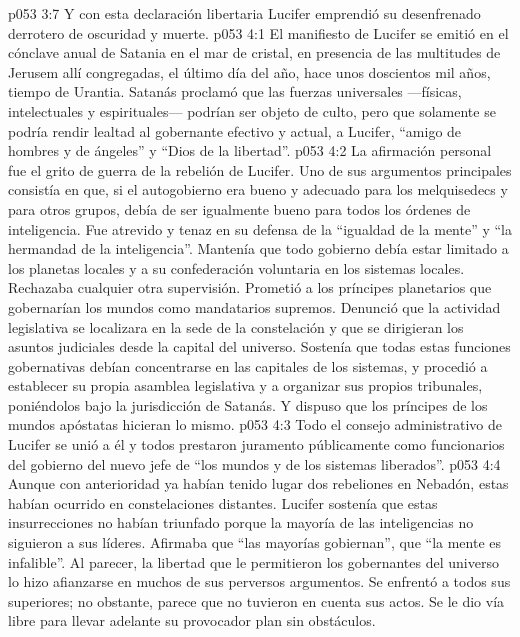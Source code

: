 \vs p053 3:7 \pc Y con esta declaración libertaria Lucifer emprendió su desenfrenado derrotero de oscuridad y muerte.
\vs p053 4:1 El manifiesto de Lucifer se emitió en el cónclave anual de Satania en el mar de cristal, en presencia de las multitudes de Jerusem allí congregadas, el último día del año, hace unos doscientos mil años, tiempo de Urantia. Satanás proclamó que las fuerzas universales ---físicas, intelectuales y espirituales--- podrían ser objeto de culto, pero que solamente se podría rendir lealtad al gobernante efectivo y actual, a Lucifer, “amigo de hombres y de ángeles” y “Dios de la libertad”.
\vs p053 4:2 La afirmación personal fue el grito de guerra de la rebelión de Lucifer. Uno de sus argumentos principales consistía en que, si el autogobierno era bueno y adecuado para los melquisedecs y para otros grupos, debía de ser igualmente bueno para todos los órdenes de inteligencia. Fue atrevido y tenaz en su defensa de la “igualdad de la mente” y “la hermandad de la inteligencia”. Mantenía que todo gobierno debía estar limitado a los planetas locales y a su confederación voluntaria en los sistemas locales. Rechazaba cualquier otra supervisión. Prometió a los príncipes planetarios que gobernarían los mundos como mandatarios supremos. Denunció que la actividad legislativa se localizara en la sede de la constelación y que se dirigieran los asuntos judiciales desde la capital del universo. Sostenía que todas estas funciones gobernativas debían concentrarse en las capitales de los sistemas, y procedió a establecer su propia asamblea legislativa y a organizar sus propios tribunales, poniéndolos bajo la jurisdicción de Satanás. Y dispuso que los príncipes de los mundos apóstatas hicieran lo mismo.
\vs p053 4:3 Todo el consejo administrativo de Lucifer se unió a él y todos prestaron juramento públicamente como funcionarios del gobierno del nuevo jefe de “los mundos y de los sistemas liberados”.
\vs p053 4:4 \pc Aunque con anterioridad ya habían tenido lugar dos rebeliones en Nebadón, estas habían ocurrido en constelaciones distantes. Lucifer sostenía que estas insurrecciones no habían triunfado porque la mayoría de las inteligencias no siguieron a sus líderes. Afirmaba que “las mayorías gobiernan”, que “la mente es infalible”. Al parecer, la libertad que le permitieron los gobernantes del universo lo hizo afianzarse en muchos de sus perversos argumentos. Se enfrentó a todos sus superiores; no obstante, parece que no tuvieron en cuenta sus actos. Se le dio vía libre para llevar adelante su provocador plan sin obstáculos.
